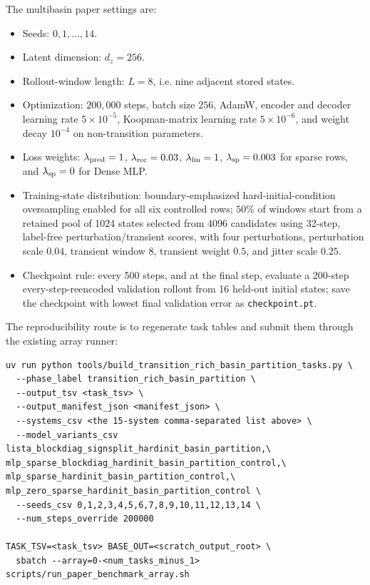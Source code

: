 The multibasin paper settings are:
\begin{itemize}
  \item Seeds: \(0,1,\ldots,14\).
  \item Latent dimension: \(d_z=256\).
  \item Rollout-window length: \(L=8\), i.e. nine adjacent stored states.
  \item Optimization: \(200{,}000\) steps, batch size \(256\), AdamW, encoder
  and decoder learning rate \(5\times10^{-5}\), Koopman-matrix learning rate
  \(5\times10^{-6}\), and weight decay \(10^{-4}\) on non-transition
  parameters.
  \item Loss weights: \(\lambda_{\rm pred}=1\), \(\lambda_{\rm rec}=0.03\),
  \(\lambda_{\rm lin}=1\), \(\lambda_{\rm sp}=0.003\) for sparse rows, and
  \(\lambda_{\rm sp}=0\) for Dense MLP.
  \item Training-state distribution: boundary-emphasized hard-initial-condition
  oversampling enabled for all six controlled rows; \(50\%\) of windows start
  from a retained pool of 1024 states selected from 4096 candidates using
  32-step, label-free perturbation/transient scores, with four perturbations,
  perturbation scale \(0.04\), transient window \(8\), transient weight \(0.5\),
  and jitter scale \(0.25\).
  \item Checkpoint rule: every 500 steps, and at the final step, evaluate a
  200-step every-step-reencoded validation rollout from 16 held-out initial
  states; save the checkpoint with lowest final validation error as
  \texttt{checkpoint.pt}.
\end{itemize}

The reproducibility route is to regenerate task tables and submit them through
the existing array runner:
\begin{verbatim}
uv run python tools/build_transition_rich_basin_partition_tasks.py \
  --phase_label transition_rich_basin_partition \
  --output_tsv <task_tsv> \
  --output_manifest_json <manifest_json> \
  --systems_csv <the 15-system comma-separated list above> \
  --model_variants_csv lista_blockdiag_signsplit_hardinit_basin_partition,\
mlp_sparse_blockdiag_hardinit_basin_partition_control,\
mlp_sparse_hardinit_basin_partition_control,\
mlp_zero_sparse_hardinit_basin_partition_control \
  --seeds_csv 0,1,2,3,4,5,6,7,8,9,10,11,12,13,14 \
  --num_steps_override 200000

TASK_TSV=<task_tsv> BASE_OUT=<scratch_output_root> \
  sbatch --array=0-<num_tasks_minus_1> scripts/run_paper_benchmark_array.sh
\end{verbatim}

